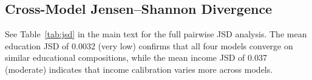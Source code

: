 \documentclass[11pt]{article}
\begin{document}
\subsection{Cross-Model Jensen--Shannon Divergence}

See Table~\ref{tab:jsd} in the main text for the full pairwise JSD analysis.
The mean education JSD of 0.0032 (very low) confirms that all four models converge on similar educational compositions, while the mean income JSD of 0.037 (moderate) indicates that income calibration varies more across models.

\balance


\end{document}
